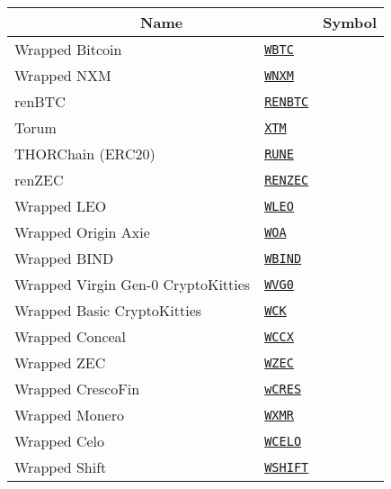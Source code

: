 \begin{tabular}{llll}
\toprule
\multicolumn{2}{|c|}{Name} & \multicolumn{2}{|c|}{Symbol} \\
\midrule
Wrapped Bitcoin & \href{https://etherscan.io/address/0x2260fac5e5542a773aa44fbcfedf7c193bc2c599}{\tt WBTC} \\
Wrapped NXM & \href{https://etherscan.io/address/0x0d438f3b5175bebc262bf23753c1e53d03432bde}{\tt WNXM} \\
renBTC & \href{https://etherscan.io/address/0xeb4c2781e4eba804ce9a9803c67d0893436bb27d}{\tt RENBTC} \\
Torum & \href{https://etherscan.io/address/0xcd1faff6e578fa5cac469d2418c95671ba1a62fe}{\tt XTM} \\
THORChain (ERC20) & \href{https://etherscan.io/address/0x3155ba85d5f96b2d030a4966af206230e46849cb}{\tt RUNE} \\
renZEC & \href{https://etherscan.io/address/0x1c5db575e2ff833e46a2e9864c22f4b22e0b37c2}{\tt RENZEC} \\
Wrapped LEO & \href{https://etherscan.io/address/0x73a9fb46e228628f8f9bb9004eca4f4f529d3998}{\tt WLEO} \\
Wrapped Origin Axie & \href{https://etherscan.io/address/0xEC0A0915A7c3443862B678B0d4721C7aB133FDCf}{\tt WOA} \\
Wrapped BIND & \href{https://etherscan.io/address/0x15334dcb171e8b65d6650321581dca83be870115}{\tt WBIND} \\
Wrapped Virgin Gen-0 CryptoKitties & \href{https://etherscan.io/address/0x25c7b64a93eb1261e130ec21a3e9918caa38b611}{\tt WVG0} \\
Wrapped Basic CryptoKitties & \href{https://etherscan.io/address/0x09fE5f0236F0Ea5D930197DCE254d77B04128075}{\tt WCK} \\
Wrapped Conceal & \href{https://etherscan.io/address/0x21686F8ce003a95c99aCd297E302FAACf742F7d4}{\tt WCCX} \\
Wrapped ZEC & \href{https://etherscan.io/address/0x4A64515E5E1d1073e83f30cB97BEd20400b66E10}{\tt WZEC} \\
Wrapped CrescoFin & \href{https://etherscan.io/address/0xa0afaa285ce85974c3c881256cb7f225e3a1178a}{\tt wCRES} \\
Wrapped Monero & \href{https://etherscan.io/address/0x465e07d6028830124be2e4aa551fbe12805db0f5}{\tt WXMR} \\
Wrapped Celo & \href{https://etherscan.io/address/0xe452e6ea2ddeb012e20db73bf5d3863a3ac8d77a}{\tt WCELO} \\
Wrapped Shift & \href{https://etherscan.io/address/0x4b4571925e94ccd8c546b39462a270cc9b3ed1e4}{\tt WSHIFT} \\
\bottomrule
\end{tabular}
